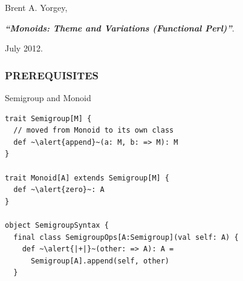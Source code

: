 \documentclass{beamer}
\begin{document}
{
\begin{frame}[plain]
  \begin{block}{}

  Brent A. Yorgey,

  {\it \bf ``Monoids: Theme and Variations (Functional Perl)''}.

  July 2012.

  \end{block}

\end{frame}
}

\begin{frame}[fragile] \frametitle{PREREQUISITES}

  \begin{block}{Semigroup and Monoid}
  \begin{lstlisting}
trait Semigroup[M] {
  // moved from Monoid to its own class
  def ~\alert{append}~(a: M, b: => M): M
}

trait Monoid[A] extends Semigroup[M] {
  def ~\alert{zero}~: A
}

object SemigroupSyntax {
  final class SemigroupOps[A:Semigroup](val self: A) {
    def ~\alert{|+|}~(other: => A): A =
      Semigroup[A].append(self, other)
  }
  \end{lstlisting}
  \end{block}
\end{frame}
\end{document}
